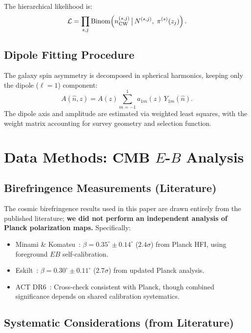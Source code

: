 \documentclass[aps,prd,twocolumn,superscriptaddress,showpacs,preprintnumbers,nofootinbib,longbibliography,floatfix]{revtex4-2}
\begin{document}
The hierarchical likelihood is:
\begin{equation}
\mathcal{L}=\prod_{s,j}\text{Binom}\!\left(n_{\rm CW}^{(s,j)}\,\big|\,N^{(s,j)},\;\pi^{(s)}(z_j)\right).
\end{equation}

\subsection{Dipole Fitting Procedure}

The galaxy spin asymmetry is decomposed in spherical harmonics, keeping only the dipole ($\ell=1$) component:
\begin{equation}
A(\hat{n},z) = A(z)\sum_{m=-1}^{1} a_{1m}(z)\,Y_{1m}(\hat{n}).
\end{equation}
The dipole axis and amplitude are estimated via weighted least squares, with the weight matrix accounting for survey geometry and selection function.


\section{Data Methods: CMB $E$-$B$ Analysis}\label{sec:data_cmb}

\subsection{Birefringence Measurements (Literature)}

The cosmic birefringence results used in this paper are drawn entirely from the published literature; \textbf{we did not perform an independent analysis of Planck polarization maps.} Specifically:
\begin{itemize}[leftmargin=*]
\item Minami \& Komatsu~\cite{Minami2020}: $\beta = 0.35^\circ \pm 0.14^\circ$ ($2.4\sigma$) from Planck HFI, using foreground $EB$ self-calibration.
\item Eskilt~\cite{Eskilt2022}: $\beta = 0.30^\circ \pm 0.11^\circ$ ($2.7\sigma$) from updated Planck analysis.
\item ACT DR6~\cite{ACT2024}: Cross-check consistent with Planck, though combined significance depends on shared calibration systematics.
\end{itemize}

\subsection{Systematic Considerations (from Literature)}
\end{document}
